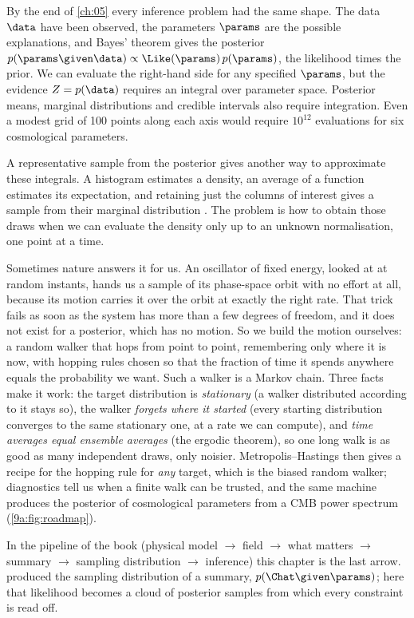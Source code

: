 By the end of \cref{ch:05} every inference problem had the same shape. The data $\data$ have
been observed, the parameters $\params$ are the possible explanations, and Bayes' theorem
gives the posterior $p(\params\given\data)\propto\Like(\params)\,p(\params)$, the likelihood
times the prior. We can evaluate the right-hand side for any specified $\params$, but the evidence
$Z=p(\data)$ requires an integral over parameter space. Posterior means,
marginal distributions and credible intervals also require integration. Even
a modest grid of 100 points along each axis would require $10^{12}$
evaluations for six cosmological parameters.

A representative sample from the posterior gives another way to approximate
these integrals. A histogram estimates a density, an average of a function
estimates its expectation, and retaining just the columns of interest gives a
sample from their marginal distribution . The problem
is how to obtain those draws when we can evaluate the density only up to an
unknown normalisation, one point at a time.

Sometimes nature answers it for us. An oscillator of fixed energy, looked at at random
instants, hands us a sample of its phase-space orbit with no effort at all, because its
motion carries it over the orbit at exactly the right rate. That trick fails as soon as the
system has more than a few degrees of freedom, and it does not exist for a posterior, which
has no motion. So we build the motion ourselves: a random walker that hops from point to
point, remembering only where it is now, with hopping rules chosen so that the fraction of
time it spends anywhere equals the probability we want. Such a walker is a Markov chain.
Three facts make it work: the target distribution is \emph{stationary} (a walker distributed
according to it stays so), the walker \emph{forgets where it started} (every starting
distribution converges to the same stationary one, at a rate we can compute), and
\emph{time averages equal ensemble averages} (the ergodic theorem), so one long walk is as good
as many independent draws, only noisier. Metropolis--Hastings then gives a recipe for the
hopping rule for \emph{any} target, which is the biased random walker;
diagnostics tell us when a finite walk can be trusted, and the same machine produces the
posterior of cosmological parameters from a CMB power spectrum
(\cref{9a:fig:roadmap}).

In the pipeline of the book (physical model $\to$ field $\to$ what matters $\to$ summary
$\to$ sampling distribution $\to$ inference) this chapter is the last arrow. 
produced the sampling distribution of a summary, $p(\Chat\given\params)$; here that likelihood
becomes a cloud of posterior samples from which every constraint is read off.

